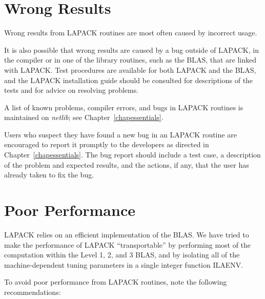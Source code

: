 \section{Wrong Results}\label{secwrongresults}

Wrong results from LAPACK routines are most often caused by incorrect usage.

It is also possible that wrong results are caused by a bug
outside of LAPACK, in the compiler or in one of the library routines,
such as the BLAS, that are linked with LAPACK.
Test procedures are available for both LAPACK and the BLAS, and
the LAPACK installation guide \cite{lawn41} should be consulted
for descriptions of the tests and for advice on resolving problems.

A list of known problems, compiler errors, and bugs in LAPACK routines is
maintained on {\em netlib}; see Chapter~\ref{chapessentials}.

Users who suspect they have found a new bug in an LAPACK routine are
encouraged to report it promptly to the developers as directed in
Chapter~\ref{chapessentials}.
The bug report should include a test case, a description of
the problem and expected results, and the actions, if any,
that the user has already taken to fix the bug.

\section{Poor Performance}

LAPACK relies on an efficient implementation of the BLAS.
We have tried to make
the performance of LAPACK ``transportable'' by performing most of
the computation within the Level 1, 2, and 3 BLAS, and by isolating
all of the machine-dependent tuning parameters
in a single integer function ILAENV.

To avoid poor performance from LAPACK 
routines, note the
following recommendations:

